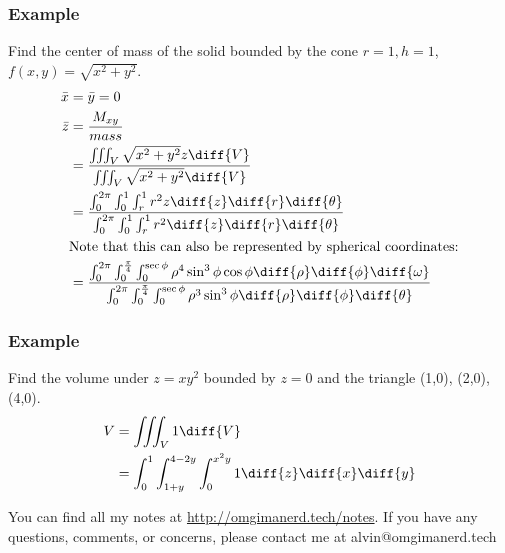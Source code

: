 \documentclass{math}
\begin{document}
\subsubsection*{Example}
Find the center of mass of the solid bounded by the cone \( r = 1, h = 1 \),
\( f(x,y) = \sqrt{x^2+y^2} \).
\begin{align*}
  \bar{x} &= \bar{y} = 0 \\
  \bar{z} &= \frac{M_{xy}}{mass} \\
  &= \frac{\iiint_{V}\sqrt{x^2+y^2}
    z\diff{V}}{\iiint_{V}\sqrt{x^2+y^2}\diff{V}} \\
  &= \frac{
    \int_{0}^{2\pi}\int_{0}^{1}\int_{r}^{1}r^2z\diff{z}\diff{r}\diff{\theta}}
    {\int_{0}^{2\pi}\int_{0}^{1}\int_{r}^{1}r^2\diff{z}\diff{r}\diff{\theta}} \\
  & \text{Note that this can also be represented by spherical coordinates:} \\
  &= \frac{\int_{0}^{2\pi}\int_{0}^{\frac{\pi}{4}}\int_{0}^{\sec\phi}
    \rho^4\sin^3\phi\cos\phi\diff{\rho}\diff{\phi}\diff{\omega}}
    {\int_{0}^{2\pi}\int_{0}^{\frac{\pi}{4}}\int_{0}^{\sec\phi}
    \rho^3\sin^3\phi\diff{\rho}\diff{\phi}\diff{\theta}}
\end{align*}

\subsubsection*{Example}
Find the volume under \( z = xy^2 \) bounded by \( z = 0 \) and the triangle
(1,0), (2,0), (4,0).
\begin{align*}
  V &= \iiint_{V}1\diff{V} \\
  &= \int_{0}^{1}\int_{1+y}^{4-2y}\int_{0}^{x^2y}1\diff{z}\diff{x}\diff{y}
\end{align*}

\begin{center}
  You can find all my notes at \url{http://omgimanerd.tech/notes}. If you have
  any questions, comments, or concerns, please contact me at
  alvin@omgimanerd.tech
\end{center}
\end{document}
